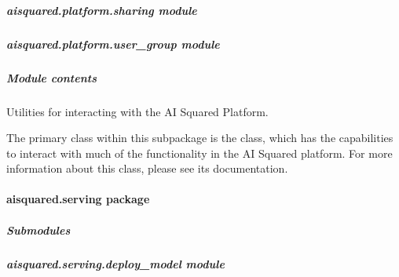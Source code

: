 \documentclass[letterpaper,10pt,english]{sphinxmanual}
\begin{document}
\subparagraph{aisquared.platform.sharing module}
\label{\detokenize{aisquared.platform:module-aisquared.platform.sharing}}\label{\detokenize{aisquared.platform:aisquared-platform-sharing-module}}

\subparagraph{aisquared.platform.user\_group module}
\label{\detokenize{aisquared.platform:module-aisquared.platform.user_group}}\label{\detokenize{aisquared.platform:aisquared-platform-user-group-module}}

\subparagraph{Module contents}
\label{\detokenize{aisquared.platform:module-aisquared.platform}}\label{\detokenize{aisquared.platform:module-contents}}
\sphinxAtStartPar
Utilities for interacting with the AI Squared Platform.

\sphinxAtStartPar
The primary class within this subpackage is the  class, which has the
capabilities to interact with much of the functionality in the AI Squared platform. For more
information about this class, please see its documentation.

\sphinxstepscope


\paragraph{aisquared.serving package}
\label{\detokenize{aisquared.serving:aisquared-serving-package}}\label{\detokenize{aisquared.serving::doc}}

\subparagraph{Submodules}
\label{\detokenize{aisquared.serving:submodules}}

\subparagraph{aisquared.serving.deploy\_model module}
\label{\detokenize{aisquared.serving:module-aisquared.serving.deploy_model}}\label{\detokenize{aisquared.serving:aisquared-serving-deploy-model-module}}
\end{document}
